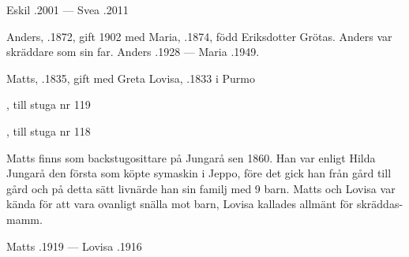 Eskil .2001  ---  Svea .2011



%


%
Anders, .1872, gift 1902 med Maria, .1874, född Eriksdotter Grötas. Anders var skräddare som sin far. Anders .1928  ---   Maria .1949.\jhvspace{}


%
Matts, .1835, gift med Greta Lovisa, .1833 i Purmo
\begin{jhchildren}
  \item {}
  \item {}
  \item {}
  \item {}
  \item {}
  \item {}
  \item {}, till stuga nr 119
  \item {}, till stuga nr 118
  \item {}
\end{jhchildren}
Matts finns som backstugosittare på Jungarå sen 1860. Han var enligt Hilda Jungarå den första som köpte symaskin i Jeppo, före det gick han från gård till gård och på detta sätt livnärde han sin familj med 9 barn. Matts och Lovisa var kända för att vara ovanligt snälla mot barn, Lovisa kallades allmänt för skräddas-mamm.

Matts .1919  ---  Lovisa .1916


%


